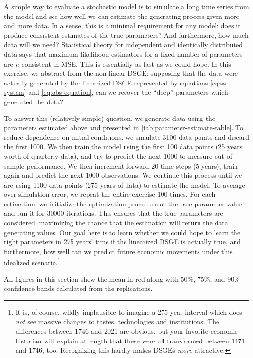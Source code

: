 \documentclass[11pt]{article}
\begin{document}
A simple way to evaluate a stochastic model is to simulate a long time
series from the model and see how well we can estimate the generating
process given more and more data. In a sense, this is a minimal
requirement for any model: does it produce consistent estimates of the
true parameters? And furthermore, how much data will we need?
Statistical theory for independent and identically distributed data says
that maximum likelihood estimators for a fixed number of parameters are
\(n\)-consistent in MSE. This is essentially as fast as we could hope.
In this exercise, we abstract from the non-linear DSGE: supposing that
the data were actually generated by the linearized DSGE represented by
equations \eqref{eq:ss-system} and \eqref{eq:obs-equation}, can we
recover the ``deep'' parameters which generated the data?

To answer this (relatively simple) question, we generate data using the
parameters estimated above and presented in
\autoref{tab:parameter-estimate-table}. To reduce dependence on initial
conditions, we simulate 3100 data points and discard the first 1000. We
then train the model using the first 100 data points (25 years worth of
quarterly data), and try to predict the next 1000 to measure
out-of-sample performance. We then increment forward 20 time-steps (5
years), train again and predict the next 1000 observations. We continue
this process until we are using 1100 data points (275 years of data) to
estimate the model. To average over simulation error, we repeat the
entire exercise 100 times. For each estimation, we initialize the
optimization procedure at the true parameter value and run it for 30000
iterations. This ensures that the true parameters are considered,
maximizing the chance that the estimation will return the data
generating values. Our goal here is to learn whether we could hope to
learn the right parameters in 275 years' time if the linearized DSGE is
actually true, and furthermore, how well can we predict future economic
movements under this idealized scenario.\footnote{It is, of course,
  wildly implausible to imagine a 275 year interval which does
  \emph{not} see massive changes to tastes, technologies and
  institutions. The differences between 1746 and 2021 are obvious, but
  your favorite economic historian will explain at length that these
  were all transformed between 1471 and 1746, too. Recognizing this
  hardly makes DSGEs \emph{more} attractive.}

All figures in this section show the mean in red along with 50\%, 75\%,
and 90\% confidence bands calculated from the replications.
\end{document}
